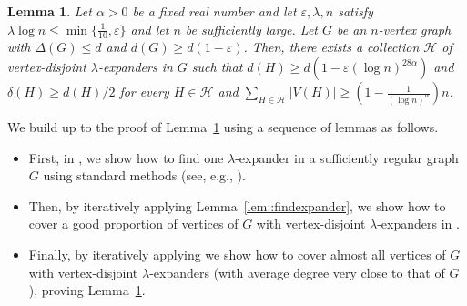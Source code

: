 \documentclass[10pt]{article}
\theoremstyle{plain}
\numberwithin{theorem}{section}
\newtheorem{lemma}[theorem]{Lemma}
\theoremstyle{definition}
\theoremstyle{remark}
\newcommand{\cH}{\mathcal{H}}
\newcommand{\eps}{\varepsilon}
\theoremstyle{plain}
\begin{document}
\begin{lemma}
	\label{lem:expandercoverweak}
	Let $\alpha > 0$ be a fixed real number and let $\eps, \lambda, n$ satisfy $\lambda \log n \le \min \{\frac{1}{10}, \eps \}$ and let $n$ be sufficiently large. Let $G$ be an $n$-vertex graph with $\Delta(G) \le d$ and $d(G) \ge d(1-\eps)$. Then, there exists a collection $\cH$ of vertex-disjoint $\lambda$-expanders in $G$ such that $d(H) \ge d(1 - \eps (\log n)^{28 \alpha})$ and $\delta(H) \ge d(H)/2$ for every $H \in \cH$ and $\sum_{H \in \cH} |V(H)| \ge (1 - \frac{1}{(\log n)^{\alpha}}) n$. 
\end{lemma}


 
We build up to the proof of Lemma~\ref{lem:expandercoverweak} using a sequence of lemmas as follows.
\begin{itemize}
    \item First, in , we show how to find one $\lambda$-expander in a sufficiently regular graph $G$ using standard methods (see, e.g., \cite{shapira2015small, draganic2023cycles}).
    \item Then, by iteratively applying Lemma~\ref{lem::findexpander}, we show how to cover a good proportion of vertices of $G$ with vertex-disjoint $\lambda$-expanders in . 
    \item  Finally, by iteratively applying  we show how to cover almost all vertices of $G$ with vertex-disjoint $\lambda$-expanders (with average degree very close to that of $G$), proving Lemma~\ref{lem:expandercoverweak}.
\end{itemize}
\end{document}
